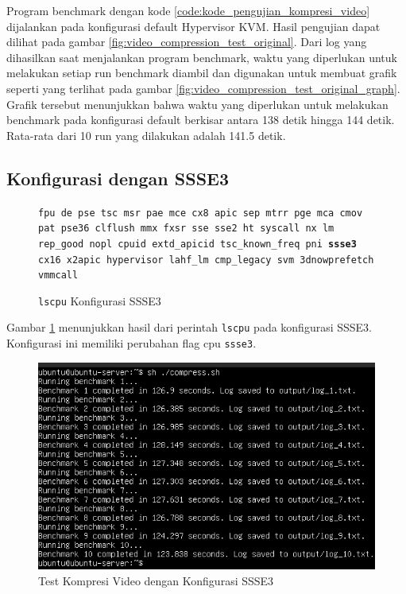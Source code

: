 Program benchmark dengan kode \ref{code:kode_pengujian_kompresi_video} dijalankan pada konfigurasi default Hypervisor KVM. Hasil pengujian dapat dilihat pada gambar \ref{fig:video_compression_test_original}. Dari log yang dihasilkan saat menjalankan program benchmark, waktu yang diperlukan untuk melakukan setiap run benchmark diambil dan digunakan untuk membuat grafik seperti yang terlihat pada gambar \ref{fig:video_compression_test_original_graph}. Grafik tersebut menunjukkan bahwa waktu yang diperlukan untuk melakukan benchmark pada konfigurasi default berkisar antara 138 detik hingga 144 detik. Rata-rata dari 10 run yang dilakukan adalah 141.5 detik.

\subsection{Konfigurasi dengan SSSE3}
\begin{figure}
    \texttt{fpu de pse tsc msr pae mce cx8 apic sep mtrr pge mca cmov pat pse36 clflush mmx fxsr sse sse2 ht syscall nx lm rep\_good nopl cpuid extd\_apicid tsc\_known\_freq pni \textbf{ssse3} cx16 x2apic hypervisor lahf\_lm cmp\_legacy svm 3dnowprefetch vmmcall}
    \caption{\texttt{lscpu} Konfigurasi SSSE3}
    \label{fig:lscpu_video_compression_test_ssse3}
\end{figure}

Gambar \ref{fig:lscpu_video_compression_test_ssse3} menunjukkan hasil dari perintah \texttt{lscpu} pada konfigurasi SSSE3. Konfigurasi ini memiliki perubahan flag cpu \texttt{ssse3}.

\begin{figure}
    \centering
    \includegraphics[width=1\textwidth]
    {assets/pics/video-compression-test/ssse3.jpeg}
    \caption{Test Kompresi Video dengan Konfigurasi SSSE3}
    \label{fig:video_compression_test_ssse3}
\end{figure}

